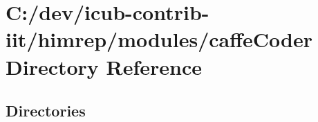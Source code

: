 \section{C\+:/dev/icub-\/contrib-\/iit/himrep/modules/caffe\+Coder Directory Reference}
\label{dir_4891338175f8223a69c081c4f51e1a95}
\subsection*{Directories}
\begin{DoxyCompactItemize}
\end{DoxyCompactItemize}
